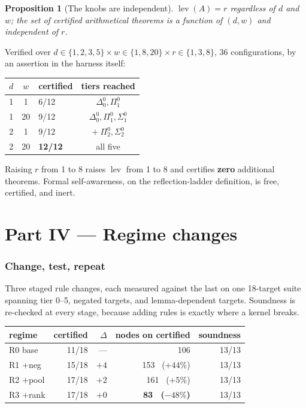 \documentclass[11pt,a4paper]{article}
\newtheorem{proposition}{Proposition}
\newcommand{\Sig}[2]{\Sigma^{#1}_{#2}}
\newcommand{\Pai}[2]{\Pi^{#1}_{#2}}
\newcommand{\Del}[2]{\Delta^{#1}_{#2}}
\newcommand{\lev}{\operatorname{lev}}
\begin{document}
\begin{proposition}[The knobs are independent]\label{prop:indep}
$\lev(A) = r$ regardless of $d$ and $w$; the set of certified arithmetical
theorems is a function of $(d,w)$ and independent of $r$.
\end{proposition}

Verified over $d \in \{1,2,3,5\} \times w \in \{1,8,20\} \times r \in
\{1,3,8\}$, 36 configurations, by an assertion in the harness itself:

\begin{center}
\begin{tabular}{@{}cclc@{}}
\toprule
$d$ & $w$ & certified & tiers reached \\
\midrule
1 & 1  & 6/12 & $\Del{0}{0}, \Pai{0}{1}$ \\
1 & 20 & 9/12 & $\Del{0}{0}, \Pai{0}{1}, \Sig{0}{1}$ \\
2 & 1  & 9/12 & $+\ \Pai{0}{2}, \Sig{0}{2}$ \\
2 & 20 & \textbf{12/12} & all five \\
\bottomrule
\end{tabular}
\end{center}

Raising $r$ from 1 to 8 raises $\lev$ from 1 to 8 and certifies \textbf{zero}
additional theorems. Formal self-awareness, on the reflection-ladder
definition, is free, certified, and inert.

\part*{Part IV --- Regime changes}

\section{Change, test, repeat}

Three staged rule changes, each measured against the last on one 18-target
suite spanning tier 0--5, negated targets, and lemma-dependent targets.
Soundness is re-checked at every stage, because adding rules is exactly where a
kernel breaks.

\begin{center}
\begin{tabular}{@{}lrrrr@{}}
\toprule
regime & certified & $\Delta$ & nodes on certified & soundness \\
\midrule
R0 base   & 11/18 & ---            & 106 & 13/13 \\
R1 $+$neg & 15/18 & \textbf{$+4$}  & 153 \ ($+44\%$) & 13/13 \\
R2 $+$pool& 17/18 & \textbf{$+2$}  & 161 \ ($+5\%$)  & 13/13 \\
R3 $+$rank& 17/18 & $+0$           & \textbf{83 \ ($-48\%$)} & 13/13 \\
\bottomrule
\end{tabular}
\end{center}
\end{document}
